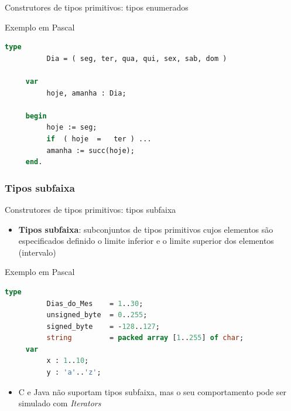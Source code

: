 \documentclass[handout]{beamer}
\begin{document}
\begin{frame}[fragile]{Construtores de tipos primitivos: tipos enumerados}
\begin{block}{Exemplo em Pascal}
	\begin{lstlisting}[language=Pascal,numbers=none]
     type
          Dia = ( seg, ter, qua, qui, sex, sab, dom )

     var
          hoje, amanha : Dia;

     begin
          hoje := seg;
          if  ( hoje  =   ter ) ...
          amanha := succ(hoje);
     end.
	\end{lstlisting}
\end{block}

\end{frame}


\subsubsection{Tipos subfaixa}

\begin{frame}[fragile]{Construtores de tipos primitivos: tipos subfaixa}
   \begin{itemize}
			\item \textbf{Tipos subfaixa}: subconjuntos de tipos primitivos cujos elementos são especificados
			definido o limite inferior e o limite superior dos elementos (intervalo)
	\end{itemize}

\begin{block}{Exemplo em Pascal}
	\begin{lstlisting}[language=Pascal,numbers=none]
     type
          Dias_do_Mes    = 1..30;
          unsigned_byte  = 0..255;
          signed_byte    = -128..127;
          string         = packed array [1..255] of char;
     var
          x : 1..10;
          y : 'a'..'z';
	\end{lstlisting}
\end{block}

   \begin{itemize}
			\item C e Java não suportam tipos subfaixa, mas o seu comportamento pode ser simulado com \textit{Iterators}
	\end{itemize}

\end{frame}
\end{document}
